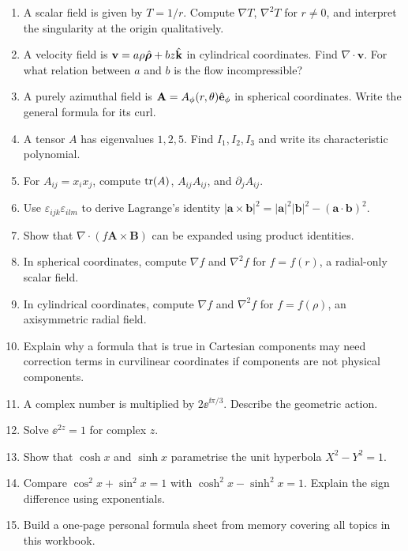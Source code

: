 \documentclass{otscience}
\begin{document}
\begin{practicebox}
\begin{enumerate}
\item A scalar field is given by \(T=1/r\). Compute \(\nabla T\), \(\nabla^2T\) for \(r\neq0\), and interpret the singularity at the origin qualitatively.
\item A velocity field is \(\mathbf{v}=a\rho\hat{\boldsymbol{\rho}}+bz\hat{\mathbf{k}}\) in cylindrical coordinates. Find \(\nabla\cdot\mathbf{v}\). For what relation between \(a\) and \(b\) is the flow incompressible?
\item A purely azimuthal field is \(\mathbf{A}=A_\phi(r,\theta)\hat{\mathbf{e}}_\phi\) in spherical coordinates. Write the general formula for its curl.
\item A tensor \(A\) has eigenvalues \(1,2,5\). Find \(I_1,I_2,I_3\) and write its characteristic polynomial.
\item For \(A_{ij}=x_{i}x_j\), compute \(\operatorname{tr}(A)\), \(A_{ij}A_{ij}\), and \(\partial_{j}A_{ij}\).
\item Use \(\varepsilon_{ijk}\varepsilon_{ilm}\) to derive Lagrange's identity \(|\mathbf{a}\times\mathbf{b}|^2=|\mathbf{a}|^2|\mathbf{b}|^2-{(\mathbf{a}\cdot\mathbf{b})}^2\).
\item Show that \(\nabla\cdot(f\mathbf{A}\times\mathbf{B})\) can be expanded using product identities.
\item In spherical coordinates, compute \(\nabla f\) and \(\nabla^2f\) for \(f=f(r)\), a radial-only scalar field.
\item In cylindrical coordinates, compute \(\nabla f\) and \(\nabla^2f\) for \(f=f(\rho)\), an axisymmetric radial field.
\item Explain why a formula that is true in Cartesian components may need correction terms in curvilinear coordinates if components are not physical components.
\item A complex number is multiplied by \(2\ee^{\ii\pi/3}\). Describe the geometric action.
\item Solve \(\ee^{2z}=1\) for complex \(z\).
\item Show that \(\cosh x\) and \(\sinh x\) parametrise the unit hyperbola \(X^2-Y^2=1\).
\item Compare \(\cos^2x+\sin^2x=1\) with \(\cosh^2x-\sinh^2x=1\). Explain the sign difference using exponentials.
\item Build a one-page personal formula sheet from memory covering all topics in this workbook.
\end{enumerate}
\end{practicebox}

\ifdefined\OTCOMBINED%
\else
\end{document}
